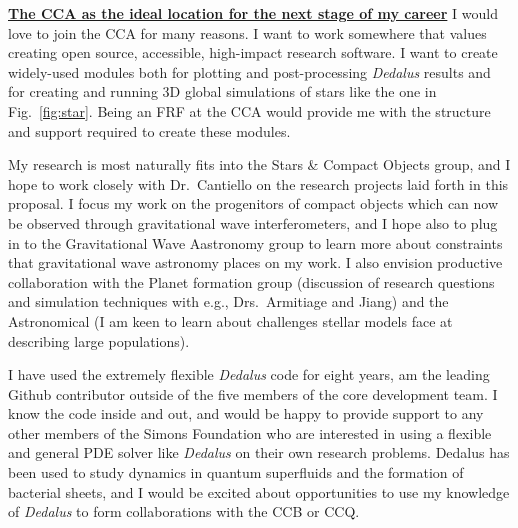 \documentclass[12pt]{article}
\newcommand{\sct}[1]{\vspace{0.3cm}\hspace{-\parindent}\textbf{\underline{#1}}\hspace{0.3cm}}
\begin{document}
\sct{The CCA as the ideal location for the next stage of my career}
I would love to join the CCA for many reasons.
I want to work somewhere that values creating open source, accessible, high-impact research software.
I want to create widely-used modules both for plotting and post-processing \emph{Dedalus} results and for creating and running 3D global simulations of stars like the one in Fig.~\ref{fig:star}.
Being an FRF at the CCA would provide me with the structure and support required to create these modules.

My research is most naturally fits into the Stars \& Compact Objects group, and I hope to work closely with Dr.~Cantiello on the research projects laid forth in this proposal.
I focus my work on the progenitors of compact objects which can now be observed through gravitational wave interferometers, and I hope also to plug in to the Gravitational Wave Aastronomy group to learn more about constraints that gravitational wave astronomy places on my work.
I also envision productive collaboration with the Planet formation group (discussion of research questions and simulation techniques with e.g., Drs.~Armitiage and Jiang) and the Astronomical (I am keen to learn about challenges stellar models face at describing large populations).

I have used the extremely flexible \emph{Dedalus} code for eight years, am the leading Github contributor outside of the five members of the core development team.
I know the code inside and out, and would be happy to provide support to any other members of the Simons Foundation who are interested in using a flexible and general PDE solver like \emph{Dedalus} on their own research problems.
Dedalus has been used to study dynamics in quantum superfluids and the formation of bacterial sheets, and I would be excited about opportunities to use my knowledge of \emph{Dedalus} to form collaborations with the CCB or CCQ.


{\scriptsize

}
\end{document}
